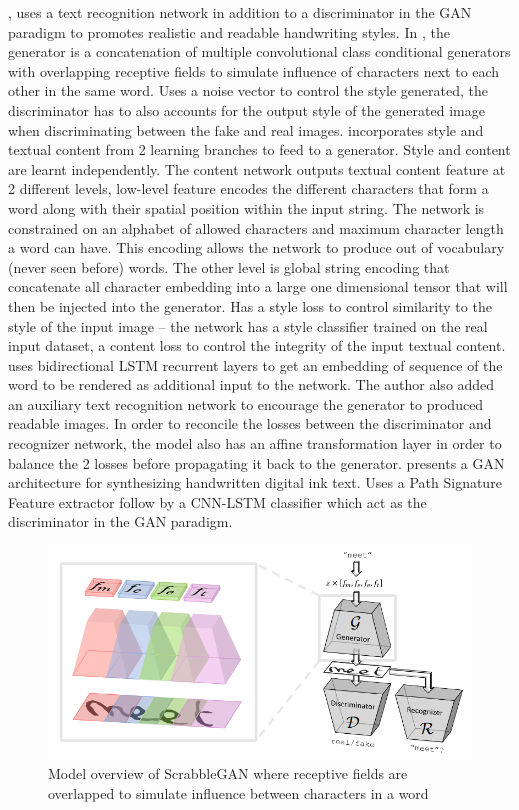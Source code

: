 \documentclass[12pt]{report}
\begin{document}
\cite{scrabble-gan}, \cite{gan-writting} uses a text recognition network in addition to a discriminator in the GAN paradigm to promotes realistic and readable handwriting styles. In \cite{scrabble-gan}, the generator is a concatenation of multiple convolutional class conditional generators with overlapping receptive fields to simulate influence of characters next to each other in the same word.
Uses a noise vector to control the style generated, the discriminator has to also accounts for the output style of the generated image when discriminating between the fake and real images.
\cite{gan-writting} incorporates style and textual content from 2 learning branches to feed to a generator. Style and content are learnt independently. The content network outputs textual content feature at 2 different levels, low-level feature encodes the different characters that form a word along with their spatial position within the input string. The network is constrained on an alphabet of allowed characters and maximum character length a word can have. This encoding allows the network to produce out of vocabulary (never seen before) words. The other level is global string encoding that concatenate all character embedding into a large one dimensional tensor that will then be injected into the generator.
Has a style loss to control similarity to the style of the input image – the network has a style classifier trained on the real input dataset, a content loss to control the integrity of the input textual content.
\cite{adversarial-gen} uses bidirectional LSTM recurrent layers \cite{lstm} to get an embedding of sequence of the word to be rendered as additional input to the network. The author also added an auxiliary text recognition network to encourage the generator to produced readable images. In order to reconcile the losses between the discriminator and recognizer network, the model also has an affine transformation layer in order to balance the 2 losses before propagating it back to the generator.
\cite{hw-gan} presents a GAN architecture for synthesizing handwritten digital ink text. Uses a Path Signature Feature extractor follow by a CNN-LSTM classifier which act as the discriminator in the GAN paradigm.

\begin{figure}[h]
	\centering
	\includegraphics[scale=0.8]{scrabble-gan}
	\caption{Model overview of ScrabbleGAN \cite{scrabble-gan} where receptive fields are overlapped to simulate influence between characters in a word}
	\label{fig:scrabble-gan}
\end{figure}
\end{document}
